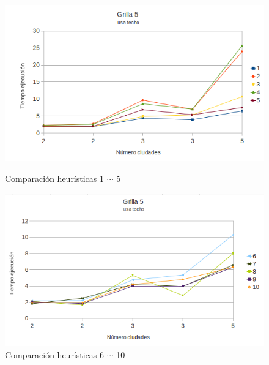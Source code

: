 \documentclass[10pt]{article}
\begin{document}
\begin{figure}[ht]
\begin{minipage}[b]{0.45\linewidth}
 \centering
 \includegraphics[width=\textwidth]{grilla5ceil0.png}
 \caption{Comparación heurísticas  1 $\cdots$ 5}
 \label{fig:grid5ceil0}
\end{minipage}
\hspace{0.5cm}
\begin{minipage}[b]{0.45\linewidth}
 
\centering
 \includegraphics[width=\textwidth]{grilla5ceil1.png}
 \caption{Comparación heurísticas  6 $\cdots$ 10}
 \label{fig:grid5ceil1}
\end{minipage}


\end{figure}
\end{document}
